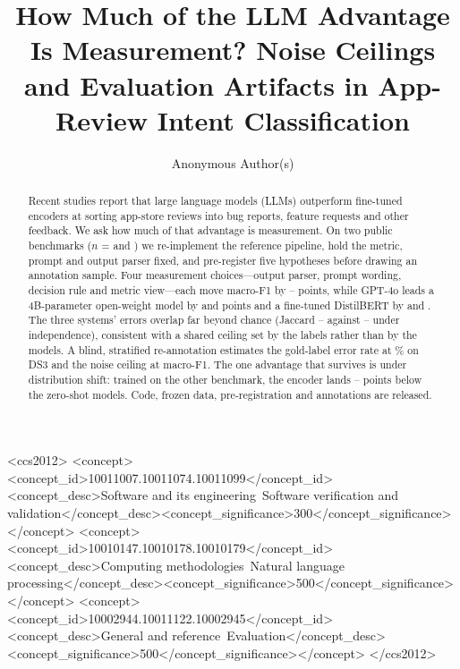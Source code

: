 \documentclass[sigconf,anonymous,review]{acmart}
\newcommand{\fone}{macro-F1\xspace}
\begin{document}
\title{How Much of the LLM Advantage Is Measurement? Noise Ceilings and Evaluation Artifacts in App-Review Intent Classification}

\author{Anonymous Author(s)}

\begin{abstract}
Recent studies report that large language models (LLMs) outperform fine-tuned encoders at sorting app-store reviews into bug reports, feature requests and other feedback. We ask how much of that advantage is measurement. On two public benchmarks ($n$ = \nDSthree{} and \nDSfour) we re-implement the reference pipeline, hold the metric, prompt and output parser fixed, and pre-register five hypotheses before drawing an annotation sample. Four measurement choices---output parser, prompt wording, decision rule and metric view---each move \fone by \artMin--\artMax{} points, while GPT-4o leads a 4B-parameter open-weight model by \gapQfourDSthree{} and \gapQfourDSfour{} points and a fine-tuned DistilBERT by \gapDbDSthree{} and \gapDbDSfour. The three systems' errors overlap far beyond chance (Jaccard \jMinDSfour--\jMaxDSthree{} against \jNullDSfour--\jNullDSthree{} under independence), consistent with a shared ceiling set by the labels rather than by the models. A blind, stratified re-annotation estimates the gold-label error rate at \epsDSthree\% on DS3 and the noise ceiling at \ceilingDSthree{} \fone. The one advantage that survives is under distribution shift: trained on the other benchmark, the encoder lands \belowGptDSthreeToDSfour--\belowGptDSfourToDSthree{} points below the zero-shot models. Code, frozen data, pre-registration and annotations are released.
\end{abstract}

\begin{CCSXML}
<ccs2012>
<concept><concept_id>10011007.10011074.10011099</concept_id><concept_desc>Software and its engineering~Software verification and validation</concept_desc><concept_significance>300</concept_significance></concept>
<concept><concept_id>10010147.10010178.10010179</concept_id><concept_desc>Computing methodologies~Natural language processing</concept_desc><concept_significance>500</concept_significance></concept>
<concept><concept_id>10002944.10011122.10002945</concept_id><concept_desc>General and reference~Evaluation</concept_desc><concept_significance>500</concept_significance></concept>
</ccs2012>
\end{CCSXML}
\end{document}
